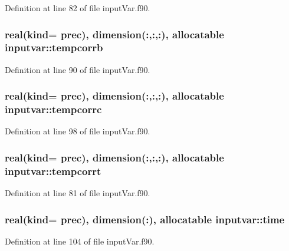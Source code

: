 Definition at line 82 of file input\-Var.\-f90.

\hypertarget{classinputvar_a4270f23d875d4a85d7bd5d6699205d03}{
\subsubsection[{tempcorrb}]{\setlength{\rightskip}{0pt plus 5cm}real(kind= prec), dimension(\-:,\-:,\-:), allocatable inputvar\-::tempcorrb}}\label{classinputvar_a4270f23d875d4a85d7bd5d6699205d03}


Definition at line 90 of file input\-Var.\-f90.

\hypertarget{classinputvar_a378a362979a22545cd843bbf687ca511}{
\subsubsection[{tempcorrc}]{\setlength{\rightskip}{0pt plus 5cm}real(kind= prec), dimension(\-:,\-:,\-:), allocatable inputvar\-::tempcorrc}}\label{classinputvar_a378a362979a22545cd843bbf687ca511}


Definition at line 98 of file input\-Var.\-f90.

\hypertarget{classinputvar_a918356589b5f04f76333e6a65de35fb8}{
\subsubsection[{tempcorrt}]{\setlength{\rightskip}{0pt plus 5cm}real(kind= prec), dimension(\-:,\-:,\-:), allocatable inputvar\-::tempcorrt}}\label{classinputvar_a918356589b5f04f76333e6a65de35fb8}


Definition at line 81 of file input\-Var.\-f90.

\hypertarget{classinputvar_a7d20a57b0a7dfe6c386e831f25636546}{
\subsubsection[{time}]{\setlength{\rightskip}{0pt plus 5cm}real(kind= prec), dimension(\-:), allocatable inputvar\-::time}}\label{classinputvar_a7d20a57b0a7dfe6c386e831f25636546}


Definition at line 104 of file input\-Var.\-f90.


